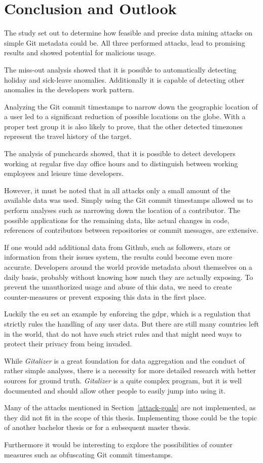 \chapter{Conclusion and Outlook}

The study set out to determine how feasible and precise data mining attacks on simple Git metadata could be.
All three performed attacks, lead to promising results and showed potential for malicious usage.

The miss-out analysis showed that it is possible to automatically detecting holiday and sick-leave anomalies.
Additionally it is capable of detecting other anomalies in the developers work pattern.

Analyzing the Git commit timestamps to narrow down the geographic location of a user led to a significant reduction of possible locations on the globe.
With a proper test group it is also likely to prove, that the other detected timezones represent the travel history of the target.

The analysis of punchcards showed, that it is possible to detect developers working at regular five day office hours and to distinguish between working employees and leisure time developers.

However, it must be noted that in all attacks only a small amount of the available data was used.
Simply using the Git commit timestamps allowed us to perform analyses such as narrowing down the location of a contributor.
The possible applications for the remaining data, like actual changes in code, references of contributors between repositories or commit messages, are extensive.

If one would add additional data from Github, such as followers, stars or information from their issues system, the results could become even more accurate.
Developers around the world provide metadata about themselves on a daily basis, probably without knowing how much they are actually exposing.
To prevent the unauthorized usage and abuse of this data, we need to create counter-measures or prevent exposing this data in the first place.

Luckily the \ac{eu} set an example by enforcing the \ac{gdpr}, which is a regulation that strictly rules the handling of any user data.
But there are still many countries left in the world, that do not have such strict rules and that might need ways to protect their privacy from being invaded.

While \emph{Gitalizer} is a great foundation for data aggregation and the conduct of rather simple analyses, there is a necessity for more detailed research with better sources for ground truth.
\emph{Gitalizer} is a quite complex program, but it is well documented and should allow other people to easily jump into using it.

Many of the attacks mentioned in Section~\ref{attack-goals} are not implemented, as they did not fit in the scope of this thesis.
Implementing those could be the topic of another bachelor thesis or for a subsequent master thesis.

Furthermore it would be interesting to explore the possibilities of counter measures such as obfuscating Git commit timestamps.
